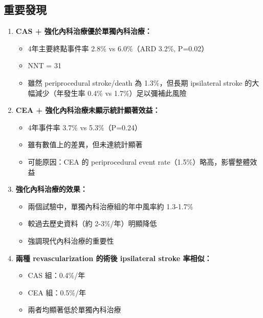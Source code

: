 \documentclass[12pt,a4paper]{article}
\begin{document}
\subsection{重要發現}

\begin{enumerate}
    \item \textcolor{emergency_red}{\textbf{CAS + 強化內科治療優於單獨內科治療：}}
    \begin{itemize}
        \item 4年主要終點事件率 2.8\% vs 6.0\%（ARD 3.2\%, P=0.02）
        \item NNT = 31
        \item 雖然 periprocedural stroke/death 為 1.3\%，但長期 ipsilateral stroke 的大幅減少（年發生率 0.4\% vs 1.7\%）足以彌補此風險
    \end{itemize}

    \item \textcolor{emergency_red}{\textbf{CEA + 強化內科治療未顯示統計顯著效益：}}
    \begin{itemize}
        \item 4年事件率 3.7\% vs 5.3\%（P=0.24）
        \item 雖有數值上的差異，但未達統計顯著
        \item 可能原因：CEA 的 periprocedural event rate（1.5\%）略高，影響整體效益
    \end{itemize}

    \item \textcolor{emergency_blue}{\textbf{強化內科治療的效果：}}
    \begin{itemize}
        \item 兩個試驗中，單獨內科治療組的年中風率約 1.3-1.7\%
        \item 較過去歷史資料（約 2-3\%/年）明顯降低
        \item 強調現代內科治療的重要性
    \end{itemize}

    \item \textcolor{emergency_blue}{\textbf{兩種 revascularization 的術後 ipsilateral stroke 率相似：}}
    \begin{itemize}
        \item CAS 組：0.4\%/年
        \item CEA 組：0.5\%/年
        \item 兩者均顯著低於單獨內科治療
    \end{itemize}
\end{enumerate}
\end{document}
